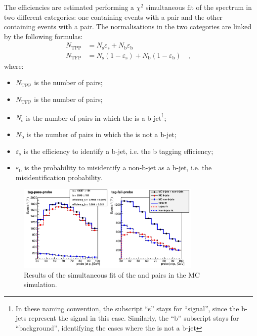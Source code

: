 The efficiencies are estimated performing a $\chi^{2}$ simultaneous fit of the \probe \pt spectrum in two different categories: one containing events with a \tpp pair and the other containing events with a \tfp pair. The normalisations in the two categories are linked by the following formulas:
\begin{equation}
\begin{split}
N_\mathrm{TPP} &= N_\mathrm{s} \varepsilon_\mathrm{s} + N_\mathrm{b} \varepsilon_\mathrm{b} \\
N_\mathrm{TFP} &= N_\mathrm{s} (1 -\varepsilon_\mathrm{s}) + N_\mathrm{b} ( 1 - \varepsilon_\mathrm{b}) \quad,
\end{split}
\end{equation}
\noindent where:
\begin{itemize}
\item $N_\mathrm{TPP}$ is the number of \tpp pairs;
\item $N_\mathrm{TFP}$ is the number of \tfp pairs;
\item $N_\mathrm{s}$ is the number of \tp pairs in which the \probe is a b-jet\footnote{In these naming convention, the subscript ``s'' stays for ``signal'', since the b-jets represent the signal in this case. Similarly, the ``b'' subscript stays for ``background'', identifying the cases where the \probe is not a b-jet};
\item $N_\mathrm{b}$ is the number of \tp pairs in which the \probe is not a b-jet;
\item $\varepsilon_\mathrm{s}$ is the efficiency to identify a b-jet, i.e. the b tagging efficiency;
\item $\varepsilon_\mathrm{b}$ is the probability to misidentify a non-b-jet as a b-jet, i.e. the misidentification probability.
\end{itemize}

\begin{figure}[htb]
\centering
\includegraphics[width=0.8\textwidth]{images/mc_pt_probe-v3.pdf}
\caption{Results of the simultaneous fit of the \tpp and \tfp pairs in the MC simulation.\label{fig:mc_tp}}
\end{figure}

